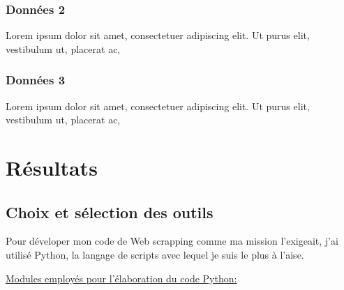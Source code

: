 \documentclass{book}
\begin{document}
\subsection{Données 2}
\noindent
Lorem ipsum dolor sit amet, consectetuer adipiscing elit. Ut purus elit,
vestibulum ut, placerat ac,

\subsection{Données 3}
\noindent
Lorem ipsum dolor sit amet, consectetuer adipiscing elit. Ut purus elit,
vestibulum ut, placerat ac,

\chapter{\label{Troisième Chapitre}Résultats}

\section{Choix et sélection des outils}
\noindent
Pour déveloper mon code de Web scrapping comme ma mission l'exigeait, j'ai
utilisé Python, la langage de scripts avec lequel je suis le plus à l'aise.

\vspace{\baselineskip}

\noindent
\underline{Modules employés pour l'élaboration du code Python:}
\end{document}
